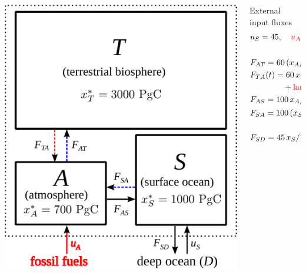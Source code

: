 

\begin{columns}
	\newlength{\lc}
	\setlength{\lc}{0.5\textwidth}
	\begin{column}{\lc}
	\includegraphics[width=0.9\lc]{images/content/model.pdf}
	\end{column}
	\newlength{\rc}
	\setlength{\rc}{\the\dimexpr (\textwidth-\lc) \relax }
	\begin{column}{\rc}
		External input fluxes
		\begin{align*}
			&u_S = 45, \quad {\color{red}u_A(t)=\text{fossil-fuels}(t)}\\
			&\vspace{3.5cm}\\
			&F_{AT} = 60\,(x_A/700){\color{blue}^{0.2}}\\
			&F_{TA}(t) = 60\,x_T/3000\\
			&\qquad\qquad + {\color{red}\text{land-use-change}(t)}\\
			&F_{AS} = 100\,x_A/700\\
			&F_{SA} = 100\,(x_S/1000){\color{blue}^{10}}\\
			&\vspace{3.5cm}\\
			&F_{SD} = 45\,x_S/1000
		\end{align*}
	\end{column}
\end{columns}
